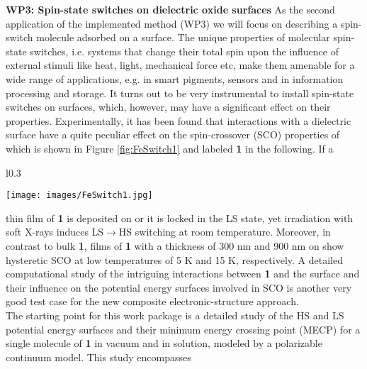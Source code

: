 \documentclass[a4paper,11pt,headings=normal]{scrartcl}
\begin{document}
\noindent
\textbf{WP3: Spin-state switches on dielectric oxide surfaces}
As the second application of the implemented method (WP3) we will focus on 
describing a spin-switch molecule adsorbed on a surface. The unique properties of 
molecular spin-state switches, i.e. systems that change their total
spin upon the influence of external stimuli like heat, light, mechanical force etc, make them amenable for a
wide range of applications, e.g. in smart pigments, sensors and in information
processing and storage. It turns out to be very instrumental to install spin-state switches on surfaces, which, however, may have a significant effect on their properties.\autocite{Kuch2021,Ruben2021} 
Experimentally, it has been found that interactions with a dielectric surface 
have a quite peculiar effect on the spin-crossover (SCO) properties of 
\ce{Fe(H2B(pz)2)2(bpy)]} 
which is shown in Figure \ref{fig:FeSwitch1} and labeled \textbf{1} in the 
following.\autocite{Dowben2017,Dowben2019a} If a 
\begin{wrapfigure}{l}{0.3\textwidth}
	\vspace{-2em}  
	\begin{center}
		\texttt{[image: images/FeSwitch1.jpg]}
	\end{center}
	\vspace{-1.5em}  
	\caption{Spin crossover complex \ce{Fe(H2B(pz)2)2(bpy)]} labeled \textbf{1} 
		in this proposal. Image reproduced from reference \cite{Dowben2019a}.}
	\label{fig:FeSwitch1}
	\vspace{-1em}  
\end{wrapfigure}
thin 
film of \textbf{1} is 
deposited on  or  it is locked in the LS state, yet 
irradiation with soft X-rays 
induces LS$\rightarrow$HS switching at room 
temperature.\autocite{Dowben2017} Moreover, in contrast to bulk \textbf{1},  
films of \textbf{1} with a 
thickness of 300 nm and 900 nm on  show hysteretic SCO at low 
temperatures of 5 K and 15 K, respectively.\autocite{Dowben2019a} A detailed 
computational study of the intriguing interactions between \textbf{1} and the 
surface and their influence on the potential energy surfaces involved in SCO  
is another very good test case for the new composite electronic-structure 
approach.\\
The starting point for this work package is a detailed study of the HS and LS 
potential energy surfaces and their minimum energy crossing point (MECP) for a  
single molecule of \textbf{1} in vacuum
and in solution, modeled by a polarizable continuum model. This study encompasses 
\end{document}
